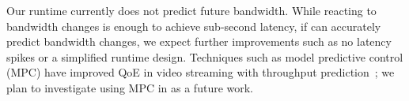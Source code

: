  Our runtime currently does not predict
future bandwidth. While reacting to bandwidth changes is enough to achieve
sub-second latency, if \sysname{} can accurately predict bandwidth changes, we
expect further improvements such as no latency spikes or a simplified runtime
design. Techniques such as model predictive control (MPC) have improved QoE in
video streaming with throughput prediction~\cite{yin2015control}; we plan to
investigate using MPC in \sysname{} as a future work.


